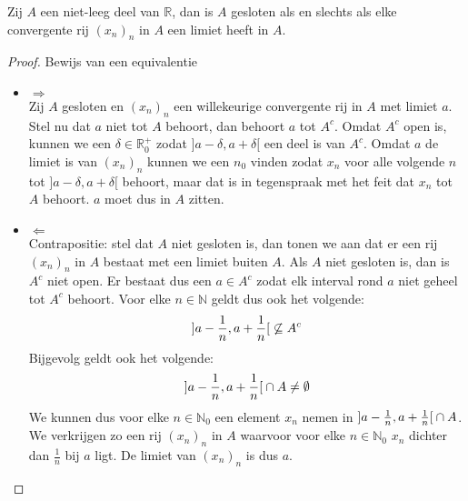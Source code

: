 \documentclass[main.tex]{subfiles}
\begin{document}
\begin{pr}
  \label{pr:gesloten-asa-elke-convergente-rij-in-A-limiet-in-A}
  Zij $A$ een niet-leeg deel van $\mathbb{R}$, dan is $A$ gesloten als en slechts als elke convergente rij $(x_{n})_{n}$ in $A$ een limiet heeft in $A$.

  \begin{proof}
    Bewijs van een equivalentie\\
    \begin{itemize}
    \item $\Rightarrow$\\
      Zij $A$ gesloten en $(x_{n})_{n}$ een willekeurige convergente rij in $A$ met limiet $a$.
      Stel nu dat $a$ niet tot $A$ behoort, dan behoort $a$ tot $A^{c}$.
      Omdat $A^{c}$ open is, kunnen we een $\delta \in \mathbb{R}_{0}^{+}$ zodat $]a-\delta,a+\delta[$ een deel is van $A^{c}$.
      Omdat $a$ de limiet is van $(x_{n})_{n}$ kunnen we een $n_{0}$ vinden zodat $x_{n}$ voor alle volgende $n$ tot $]a-\delta,a+\delta[$ behoort, maar dat is in tegenspraak met het feit dat $x_{n}$ tot $A$ behoort.
      $a$ moet dus in $A$ zitten.
    \item $\Leftarrow$\\
      Contrapositie: stel dat $A$ niet gesloten is, dan tonen we aan dat er een rij $(x_{n})_{n}$ in $A$ bestaat met een limiet buiten $A$.
      Als $A$ niet gesloten is, dan is $A^{c}$ niet open.
      Er bestaat dus een $a\in A^{c}$ zodat elk interval rond $a$ niet geheel tot $A^{c}$ behoort.
      Voor elke $n \in \mathbb{N}$ geldt dus ook het volgende:
      \[ \interval[open]{a-\frac{1}{n}}{a+\frac{1}{n}} \not \subseteq A^{c} \]
      Bijgevolg geldt ook het volgende:
      \[ \interval[open]{a-\frac{1}{n}}{a+\frac{1}{n}} \cap A \neq \emptyset \]
      We kunnen dus voor elke $n\in \mathbb{N}_{0}$ een element $x_{n}$ nemen in $\interval[open]{a-\frac{1}{n}}{a+\frac{1}{n}} \cap A$.
      We verkrijgen zo een rij $(x_{n})_{n}$ in $A$ waarvoor voor elke $n\in \mathbb{N}_{0}$ $x_{n}$ dichter dan $\frac{1}{n}$ bij $a$ ligt.
      De limiet van $(x_{n})_{n}$ is dus $a$.
    \end{itemize}
  \end{proof}
\end{pr}
\end{document}

